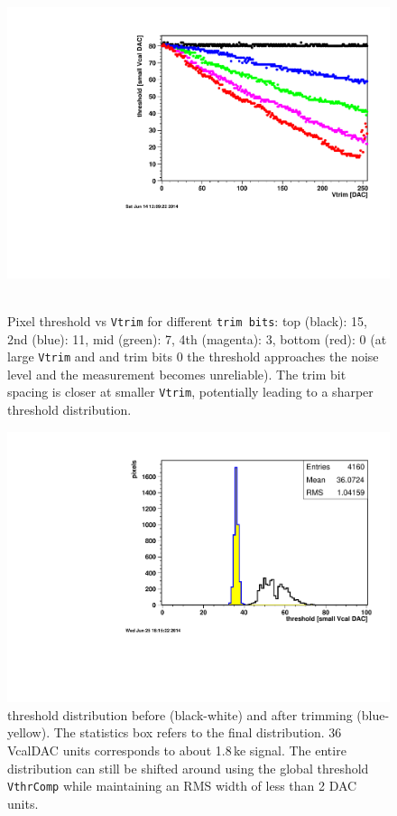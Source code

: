 \documentclass[english]{article}
\begin{document}
%
\begin{figure}
\hfill{}\includegraphics[scale=0.5]{c405-thr-vs-vtrim}\hfill{}~\protect\caption{Pixel threshold vs \texttt{Vtrim} for different \texttt{trim bits}:
top (black): 15, 2nd (blue): 11, mid (green): 7, 4th (magenta): 3,
bottom (red): 0 (at large \texttt{Vtrim} and and trim bits 0 the threshold
approaches the noise level and the measurement becomes unreliable).
The trim bit spacing is closer at smaller \texttt{Vtrim}, potentially
leading to a sharper threshold distribution.}
%
\end{figure}


%
\begin{figure}
\includegraphics[scale=0.5]{c405-thrdist-trim36}\caption{threshold distribution before (black-white) and after trimming (blue-yellow).
The statistics box refers to the final distribution. 36 VcalDAC units
corresponds to about 1.8\,ke signal. The entire distribution can
still be shifted around using the global threshold \texttt{VthrComp}
while maintaining an RMS width of less than 2 DAC units.}
%
\end{figure}
\end{document}
